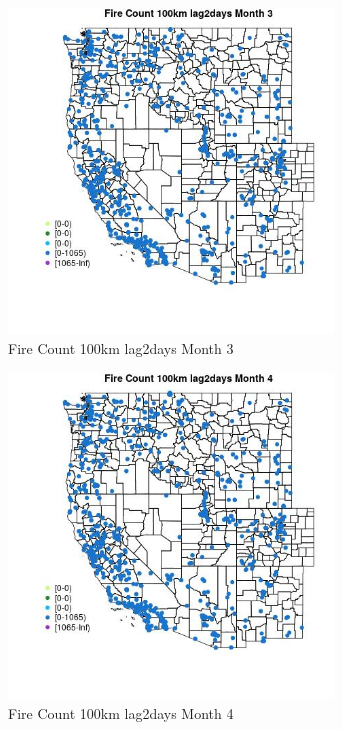 \begin{figure} 
\centering  
\includegraphics[width=0.77\textwidth]{Code_Outputs/Report_ML_input_PM25_Step4_part_f_de_duplicated_aveswNAs_MapObsMo3Fire_Count_100km_lag2days.jpg} 
\caption{\label{fig:Report_ML_input_PM25_Step4_part_f_de_duplicated_aveswNAsMapObsMo3Fire_Count_100km_lag2days}Fire Count 100km lag2days Month 3} 
\end{figure} 
 

\begin{figure} 
\centering  
\includegraphics[width=0.77\textwidth]{Code_Outputs/Report_ML_input_PM25_Step4_part_f_de_duplicated_aveswNAs_MapObsMo4Fire_Count_100km_lag2days.jpg} 
\caption{\label{fig:Report_ML_input_PM25_Step4_part_f_de_duplicated_aveswNAsMapObsMo4Fire_Count_100km_lag2days}Fire Count 100km lag2days Month 4} 
\end{figure} 
 

